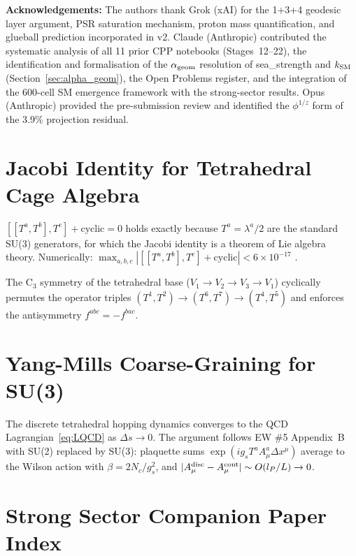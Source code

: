 \documentclass[11pt,letterpaper]{article}
\newcommand{\lP}{l_P}
\begin{document}
\noindent\textbf{Acknowledgements:}
The authors thank Grok (xAI) for the 1+3+4 geodesic layer argument,
PSR saturation mechanism, proton mass quantification, and glueball
prediction incorporated in v2.  Claude (Anthropic) contributed the
systematic analysis of all 11 prior CPP notebooks (Stages~12--22),
the identification and formalisation of the $\alpha_{\rm geom}$
resolution of sea\_strength and $k_{\rm SM}$ (Section~\ref{sec:alpha_geom}),
the Open Problems register, and the integration of the 600-cell SM
emergence framework with the strong-sector results.  Opus
(Anthropic) provided the pre-submission review and identified
the $\phi^{1/z}$ form of the 3.9\% projection residual.

\appendix

\section{Jacobi Identity for Tetrahedral Cage Algebra}
\label{app:jacobi}

$[[T^a,T^b],T^c]+\text{cyclic}=0$ holds exactly because $T^a =
\lambda^a/2$ are the standard SU(3) generators, for which the Jacobi
identity is a theorem of Lie algebra theory.  Numerically:
$\max_{a,b,c}|[[T^a,T^b],T^c]+\text{cyclic}| < 6\times10^{-17}$
\citep{cpp_ss_mc}.

The C$_3$ symmetry of the tetrahedral base ($V_1\to V_2\to V_3\to
V_1$) cyclically permutes the operator triples
$(T^1,T^2)\to(T^6,T^7)\to(T^4,T^5)$ and enforces the
antisymmetry $f^{abc} = -f^{bac}$.

\section{Yang-Mills Coarse-Graining for SU(3)}
\label{app:coarse}

The discrete tetrahedral hopping dynamics converges to the QCD
Lagrangian~\eqref{eq:LQCD} as $\Delta s\to 0$.  The argument
follows EW \#5 Appendix~B~\citep{cpp_ew5} with SU(2) replaced
by SU(3): plaquette sums $\exp(ig_s T^a A^a_\mu\Delta x^\mu)$
average to the Wilson action with $\beta = 2N_c/g_s^2$, and
$|A_\mu^{\rm disc} - A_\mu^{\rm cont}|\sim O(\lP/L)\to0$.

\section{Strong Sector Companion Paper Index}
\label{app:index}
\end{document}
